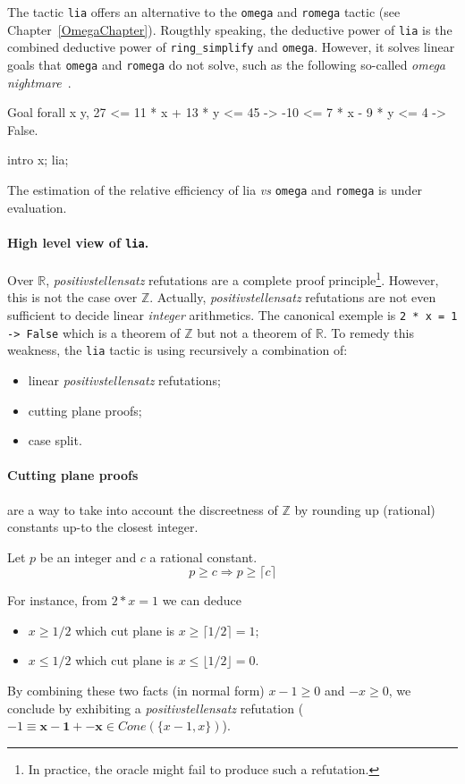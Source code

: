 \label{sec:lia}

The tactic {\tt lia} offers an alternative to the {\tt omega} and {\tt romega} tactic (see
Chapter~\ref{OmegaChapter}). 
%
Rougthly speaking, the deductive power of {\tt lia} is the combined deductive power of {\tt ring\_simplify} and {\tt omega}.
%
However, it solves linear goals that {\tt omega} and {\tt romega} do not solve, such as the
following so-called \emph{omega nightmare}~\cite{TheOmegaPaper}.
\begin{coq_example*}
  Goal forall x y, 
       27 <= 11 * x + 13 * y <= 45 -> 
       -10 <= 7 * x - 9 * y <= 4 ->   False.
\end{coq_example*}
\begin{coq_eval}
intro x; lia;
\end{coq_eval}
The estimation of the relative efficiency of lia \emph{vs} {\tt omega}
and {\tt romega} is under evaluation.

\paragraph{High level view of {\tt lia}.}
Over $\mathbb{R}$,  \emph{positivstellensatz} refutations are a complete proof principle\footnote{In practice, the oracle might fail to produce such a refutation.}.
%
However, this is not the case over $\mathbb{Z}$.
%
Actually, \emph{positivstellensatz} refutations are not even sufficient to decide linear \emph{integer} 
arithmetics.
%
The canonical exemple is {\tt 2 * x = 1 -> False} which is a theorem of $\mathbb{Z}$ but not a theorem of $\mathbb{R}$.
%
To remedy this weakness, the {\tt lia} tactic is using recursively a combination of:
%
\begin{itemize}
\item linear \emph{positivstellensatz} refutations;
\item cutting plane proofs;
\item case split.
\end{itemize}

\paragraph{Cutting plane proofs} are a way to take into account the discreetness of $\mathbb{Z}$ by rounding up
(rational) constants up-to the closest integer. 
%
\begin{theorem}
  Let $p$ be an integer and $c$ a rational constant.
  \[
  p \ge c \Rightarrow p \ge \lceil c \rceil
  \]
\end{theorem}
For instance, from $2 * x = 1$ we can deduce 
\begin{itemize}
\item $x \ge 1/2$ which cut plane is $ x \ge \lceil 1/2 \rceil = 1$;
\item $ x \le 1/2$ which cut plane is $ x \le \lfloor 1/2 \rfloor = 0$.
\end{itemize}
By combining these two facts (in normal form) $x - 1 \ge 0$ and $-x \ge 0$, we conclude by exhibiting a
\emph{positivstellensatz} refutation ($-1 \equiv \mathbf{x-1} + \mathbf{-x}  \in Cone(\{x-1,x\})$).

